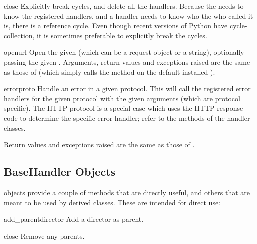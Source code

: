 \begin{methoddesc}[OpenerDirector]{close}{}
Explicitly break cycles, and delete all the handlers.
Because the  needs to know the registered handlers,
and a handler needs to know who the  who called
it is, there is a reference cycle.  Even though recent versions of Python
have cycle-collection, it is sometimes preferable to explicitly break
the cycles.
\end{methoddesc}

\begin{methoddesc}[OpenerDirector]{open}{url}
Open the given  (which can be a request object or a string),
optionally passing the given .
Arguments, return values and exceptions raised are the same as those
of  (which simply calls the  method
on the default installed ).
\end{methoddesc}

\begin{methoddesc}[OpenerDirector]{error}{proto}
Handle an error in a given protocol.  This will call the registered
error handlers for the given protocol with the given arguments (which
are protocol specific).  The HTTP protocol is a special case which
uses the HTTP response code to determine the specific error handler;
refer to the  methods of the handler classes.

Return values and exceptions raised are the same as those
of .
\end{methoddesc}


\subsection{BaseHandler Objects \label{base-handler-objects}}

 objects provide a couple of methods that are
directly useful, and others that are meant to be used by derived
classes.  These are intended for direct use:

\begin{methoddesc}[BaseHandler]{add_parent}{director}
Add a director as parent.
\end{methoddesc}

\begin{methoddesc}[BaseHandler]{close}{}
Remove any parents.
\end{methoddesc}

